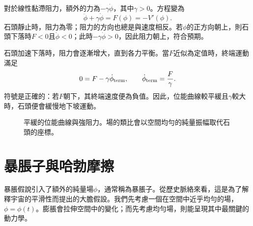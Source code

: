 對於線性黏滯阻力，額外的力為\(-\gamma\dot\phi\)，其中\(\gamma>0\)。方程變為
\begin{equation}
\ddot\phi+\gamma\dot\phi=F(\phi)
=-V'(\phi).
\label{eq:c08-viscous-motion}
\end{equation}
石頭靜止時，阻力為零；阻力的方向也總是與速度相反。若\(\phi\)的正方向朝上，則石頭下落時\(F<0\)且\(\dot\phi<0\)；此時\(-\gamma\dot\phi>0\)，因此阻力朝上，符合預期。

\begin{classroomqa}
\end{classroomqa}

石頭加速下落時，阻力會逐漸增大，直到各力平衡。當\(F\)近似為定值時，終端運動滿足
\begin{equation}
0=F-\gamma\dot\phi_{\rm term},
\qquad
\dot\phi_{\rm term}=\frac{F}{\gamma}.
\end{equation}
符號是正確的：若\(F\)朝下，其終端速度便為負值。因此，位能曲線較平緩且\(\gamma\)較大時，石頭便會緩慢地下坡運動。

\begin{figure}[htbp]
\centering
{}
\caption{平緩的位能曲線與強阻力。場的類比會以空間均勻的純量振幅取代石頭的座標。}
\label{fig:c08-shallow-potential}
\end{figure}

\section{暴脹子與哈勃摩擦}

暴脹假說引入了額外的純量場\(\phi\)，通常稱為暴脹子。從歷史脈絡來看，這是為了解釋宇宙的平滑性而提出的大膽假設。我們先考慮一個在空間中近乎均勻的場，\(\phi=\phi(t)\)。膨脹會拉伸空間中的變化；而先考慮均勻場，則能呈現其中最關鍵的動力學。

